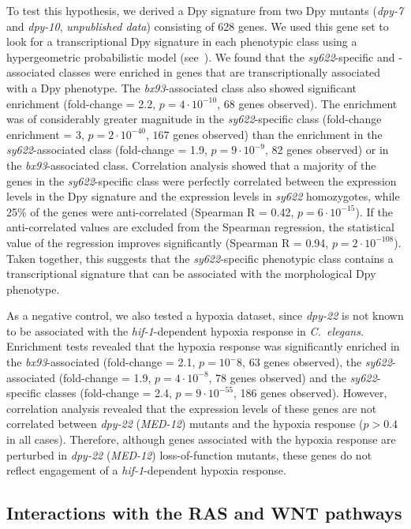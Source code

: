 \documentclass[10pt, twocolumn]{article}
\newcommand{\cel}{\emph{C.~elegans}}
\newcommand{\gene}[1]{\mbox{\emph{#1}}}
\newcommand{\dpy}{\gene{dpy-22} (\emph{MED-12})}
\begin{document}
To test this hypothesis, we derived a Dpy signature from two Dpy mutants
(\gene{dpy-7} and \gene{dpy-10}, \emph{unpublished data}) consisting of 628
genes. We used this gene set to look for a transcriptional Dpy signature in each
phenotypic class using a hypergeometric probabilistic model
(see~). We found that the \emph{sy622}-specific and
-associated classes were enriched in genes that are transcriptionally associated
with a Dpy phenotype. The \emph{bx93}-associated class also showed significant
enrichment (fold-change = 2.2, $p=4\cdot10^{-10}$, 68 genes observed). The
enrichment was of considerably greater magnitude in the \emph{sy622}-specific
class (fold-change enrichment = 3, $p=2\cdot 10^{-40}$, $167$ genes observed)
than the enrichment in the \emph{sy622}-associated class (fold-change = 1.9,
$p=9\cdot10^{-9}$, 82 genes observed) or in the \emph{bx93}-associated class.
Correlation analysis showed that a majority of the genes in the
\emph{sy622}-specific class were perfectly correlated between the expression
levels in the Dpy signature and the expression levels in \emph{sy622}
homozygotes, while 25\% of the genes were anti-correlated (Spearman R = 0.42,
$p=6\cdot10^{-15}$). If the anti-correlated values are excluded from the
Spearman regression, the statistical value of the regression improves
significantly (Spearman R = 0.94, $p=2\cdot10^{-108}$). Taken together, this
suggests that the \emph{sy622}-specific phenotypic class contains a
transcriptional signature that can be associated with the morphological Dpy
phenotype.

As a negative control, we also tested a hypoxia dataset, since \emph{dpy-22} is
not known to be associated with the \gene{hif-1}-dependent hypoxia response in
\cel{}. Enrichment tests revealed that the hypoxia response was significantly
enriched in the \emph{bx93}-associated (fold-change = 2.1, $p=10^-{8}$, 63 genes
observed), the \emph{sy622}-associated (fold-change = 1.9, $p=4\cdot10^{-8}$, 78
genes observed) and the \emph{sy622}-specific classes (fold-change = 2.4,
$p=9\cdot10^{-55}$, 186 genes observed). However, correlation analysis revealed
that the expression levels of these genes are not correlated between \dpy{}
mutants and the hypoxia response ($p > 0.4$ in all cases). Therefore, although
genes associated with the hypoxia response are perturbed in \dpy{}
loss-of-function mutants, these genes do not reflect engagement of a
\gene{hif-1}-dependent hypoxia response.

\subsection*{Interactions with the RAS and WNT pathways}
\end{document}
